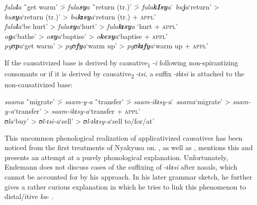 \begin{exe}
\ex \label{exApplCausSpirantizing}
\begin{tabbing}
\textit{fula\textbf{l}a} \=`get warm' \= > \textit{fula\textbf{sy}a} \=`return (tr.)' \= > \textit{fula\textbf{kIsy}a} \=\kill %
\textit{bu\textbf{j}a}\>`return'\> > \textit{bu\textbf{sy}a}\>`return (tr.)'\> > \textit{bu\textbf{kɪsy}a}\>`return (tr.) + \textsc{appl}'
\\\textit{fula\textbf{l}a}\>`be hurt'\> > \textit{fula\textbf{sy}a}\>`hurt'\> > \textit{fula\textbf{kɪsy}a}\> \lq hurt + \textsc{appl}'
\\\textit{o\textbf{g}a}\>`bathe'\> > \textit{o\textbf{sy}a}\>`baptise'\> > \textit{o\textbf{kesy}a}\>`baptise + \textsc{appl}'
\\\textit{pyʊ\textbf{p}a}\>`get warm'\> > \textit{pyʊ\textbf{fy}a}\>`warm up'\> > \textit{pyʊ\textbf{kɪfy}a}\>`warm up + \textsc{appl}'
\end{tabbing}
\end{exe}

If the causativized base is derived by causative\textsubscript{1} -\textit{i} following non-spirantizing consonants or if it is derived by causative\textsubscript{2} -\textit{ɪsi}, a suffix -\textit{ɪkɪsi} is attached to the non-causativized base:%

\begin{exe}
\ex
\begin{tabbing}
\textit{saama} \=`migrate' \= > \textit{saam-y-a} \=`transfer' \= > \textit{saam-ikɪsy-a} \=\kill %
\textit{saama}\>`migrate'\> > \textit{saam-y-a}\>`transfer'\> > \textit{saam-ikɪsy-a}\>`transfer + \textsc{appl}'
\\\textit{ʊla}\>`buy'\> > \textit{ʊl-ɪsi-a}\>`sell'\> > \textit{ʊl-ɪkɪsy-a}\>`sell to/for/at'
\end{tabbing}
\end{exe}

This uncommon phonological realization of applicativized causatives has been noticed from the first treatments of Nyakyusa on. \citet{MeinhofC1966}, as well as \citet{SchumannK1899}, mentions this and \citet{EndemannK1900} presents an attempt at a purely phonological explanation. Unfortunately, Endemann does not discuss cases of the suffixing of \mbox{-\textit{ɪkɪsi}} after nasals, which cannot be accounted for by his approach. In his later grammar sketch, he further gives a rather curious explanation in which he tries to link this phenomenon to distal/itive \textit{ka}- \citep[51]{EndemannC1914}.

